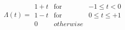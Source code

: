 \documentclass[preview]{standalone}
\begin{document}
\begin{align*}
\Lambda(t)={\begin{array}{rcl}1+t & \textrm{for} & -1\leq t<0 \\ 1-t & \textrm{for} & 0\leq t \leq +1 \\ 0 & otherwise \end{array}}
\end{align*}
\end{document}
